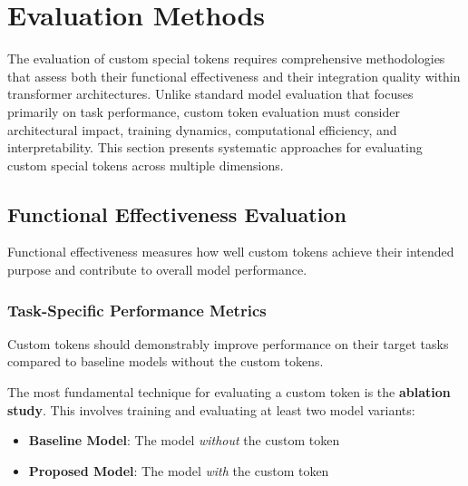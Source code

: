 
\section{Evaluation Methods}

The evaluation of custom special tokens requires comprehensive methodologies that assess both their functional effectiveness and their integration quality within transformer architectures. Unlike standard model evaluation that focuses primarily on task performance, custom token evaluation must consider architectural impact, training dynamics, computational efficiency, and interpretability. This section presents systematic approaches for evaluating custom special tokens across multiple dimensions.
\begin{comment}
Feedback: Before diving into the specifics, it's helpful to establish the core questions a good evaluation should answer. For example: "A robust evaluation framework for a custom token should answer three key questions:
1.  **Does it work?** (Ablation Studies): Does the token actually improve performance on the target task compared to a model without it?
2.  **Is it learning what we think it's learning?** (Probing Tasks): Does the token's embedding actually encode the specific information we designed it to capture?
3.  **How does it change the model's behavior?** (Behavioral Analysis): How does the token affect the model's attention patterns and internal representations?"
\end{comment}

\subsection{Functional Effectiveness Evaluation}

Functional effectiveness measures how well custom tokens achieve their intended purpose and contribute to overall model performance.

\subsubsection{Task-Specific Performance Metrics}

Custom tokens should demonstrably improve performance on their target tasks compared to baseline models without the custom tokens.

The most fundamental technique for evaluating a custom token is the \textbf{ablation study}. This involves training and evaluating at least two model variants:
\begin{itemize}
\item \textbf{Baseline Model}: The model \emph{without} the custom token
\item \textbf{Proposed Model}: The model \emph{with} the custom token
\end{itemize}

